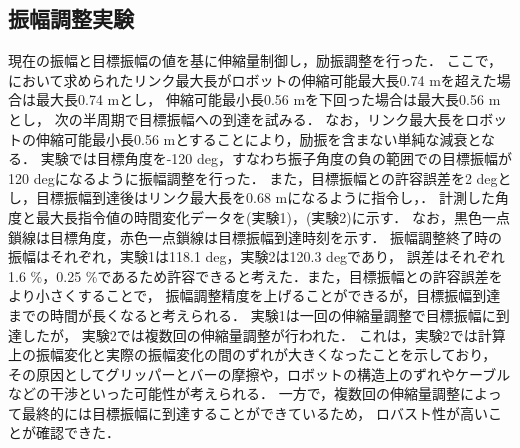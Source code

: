         \subsection{振幅調整実験}
        
        現在の振幅と目標振幅の値を基に伸縮量制御し，励振調整を行った．
        ここで，において求められたリンク最大長がロボットの伸縮可能最大長0.74 mを超えた場合は最大長0.74 mとし，
        伸縮可能最小長0.56 mを下回った場合は最大長0.56 mとし，
        次の半周期で目標振幅への到達を試みる．
        なお，リンク最大長をロボットの伸縮可能最小長0.56 mとすることにより，励振を含まない単純な減衰となる．
        実験では目標角度を-120 deg，すなわち振子角度の負の範囲での目標振幅が120 degになるように振幅調整を行った．
        また，目標振幅との許容誤差を2 degとし，目標振幅到達後はリンク最大長を0.68 mになるように指令し，．
        計測した角度と最大長指令値の時間変化データを(実験1)，(実験2)に示す．
        なお，黒色一点鎖線は目標角度，赤色一点鎖線は目標振幅到達時刻を示す．
        振幅調整終了時の振幅はそれぞれ，実験1は118.1 deg，実験2は120.3 degであり，
        誤差はそれぞれ1.6 $\%$，0.25 $\%$であるため許容できると考えた．また，目標振幅との許容誤差をより小さくすることで，
        振幅調整精度を上げることができるが，目標振幅到達までの時間が長くなると考えられる．
        実験1は一回の伸縮量調整で目標振幅に到達したが，
        実験2では複数回の伸縮量調整が行われた．
        これは，実験2では計算上の振幅変化と実際の振幅変化の間のずれが大きくなったことを示しており，
        その原因としてグリッパーとバーの摩擦や，ロボットの構造上のずれやケーブルなどの干渉といった可能性が考えられる．
        一方で，複数回の伸縮量調整によって最終的には目標振幅に到達することができているため，
        ロバスト性が高いことが確認できた．
        





          


